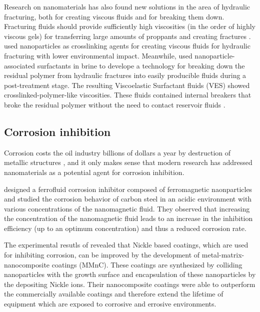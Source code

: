 Research on nanomaterials has also found new solutions in the area of hydraulic fracturing, both for creating viscous fluids and for breaking them down. Fracturing fluids should provide sufficiently high viscosities (in the order of highly viscous gels) for transferring large amounts of proppants and creating fractures \citep{Weaver2002}. \citet{Hurnaus2015} used nanoparticles as crosslinking agents for creating viscous fluids for hydraulic fracturing with lower environmental impact. Meanwhile, \citet{Crews2010} used nanoparticle-associated surfactants in brine to develope a technology for breaking down the residual polymer from hydraulic fractures into easily producible fluids during a post-treatment stage. The resulting Viscoelastic Surfactant fluids (VES) showed crosslinked-polymer-like viscosities. These fluids contained internal breakers that broke the residual polymer without the need to contact reservoir fluids \citep{Crews2007}.

\subsection{Corrosion inhibition}
Corrosion  costs the oil industry billions of dollars a year by destruction of metallic structures \citep{Brondel1994}, and it only makes sense that modern research has addressed nanomaterials as a potential agent for corrosion inhibition. 

\citet{Jauhari2011} designed a ferrofluid corrosion inhibitor composed of ferromagnetic naonparticles and studied the corrosion behavior of carbon steel in an acidic environment with various concentrations of the nanomagnetic fluid. They observed that increasing the concentration of the nanomagnetic fluid leads to an increase in the inhibition efficiency (up to an optimum concentration) and thus a reduced corrosion rate. 

The experimental resutls of \citet{Murugesan2016} revealed that Nickle based coatings, which are used for inhibiting corrosion, can be improved by the development of metal-matrix-nanocomposite coatings (MMnC). These coatings are synthesized by colliding nanoparticles with the growth surface and encapsulation of these nanoparticles by the depositing Nickle ions. Their nanocomposite coatings were able to outperform the commercially available coatings and therefore extend the lifetime of equipment which are exposed to corrosive and errosive environments. 

